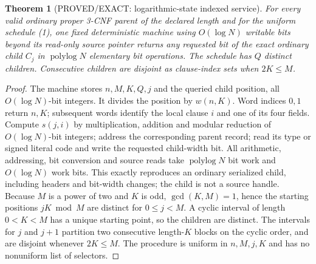 \documentclass[11pt]{article}
\newtheorem{theorem}{Theorem}
\newcommand{\polylog}{\operatorname{polylog}}
\begin{document}
\begin{theorem}[PROVED/EXACT: logarithmic-state indexed service]
For every valid ordinary proper 3-CNF parent of the declared length
and for the uniform schedule (1), one fixed deterministic machine
using $O(\log N)$ writable bits beyond its read-only source pointer
returns \emph{any requested bit} of the exact ordinary child $C_j$
in $\polylog N$ elementary bit operations. The schedule has $Q$
distinct children. Consecutive children are disjoint as clause-index
sets when $2K\le M$.
\end{theorem}
\begin{proof}
The machine stores $n,M,K,Q,j$ and the queried child position,
all $O(\log N)$-bit integers. It divides the position by $w(n,K)$.
Word indices $0,1$ return $n,K$; subsequent words identify the
local clause $i$ and one of its four fields. Compute
$s(j,i)$ by multiplication, addition and modular reduction of
$O(\log N)$-bit integers; address the corresponding parent record;
read its type or signed literal code and write the requested
child-width bit. All arithmetic, addressing, bit conversion and
source reads take $\polylog N$ bit work and $O(\log N)$ work bits.
This exactly reproduces an ordinary serialized child, including
headers and bit-width changes; the child is not a source handle.
Because $M$ is a power of two and $K$ is odd,
$\gcd(K,M)=1$, hence the starting positions $jK\bmod M$
are distinct for $0\le j<M$. A cyclic interval of length
$0<K<M$ has a unique starting point, so the children are distinct.
The intervals for $j$ and $j+1$ partition two consecutive
length-$K$ blocks on the cyclic order, and are disjoint whenever
$2K\le M$. The procedure is uniform in $n,M,j,K$ and has no
nonuniform list of selectors.
\end{proof}
\end{document}
